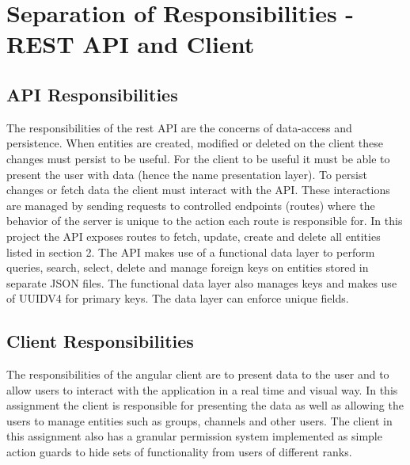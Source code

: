 \documentclass[11pt, conference,letterpaper]{IEEEtran}
\begin{document}
\section{Separation of Responsibilities - REST API and Client}
\subsection{API Responsibilities}
The responsibilities of the rest API are the concerns of data-access and persistence. When entities are created, modified or deleted on the client these changes must persist to be useful. For the client to be useful it must be able to present the user with data (hence the name presentation layer). To persist changes or fetch data the client must interact with the API. These interactions are managed by sending requests to controlled endpoints (routes) where the behavior of the server is unique to the action each route is responsible for. In this project the API exposes routes to fetch, update, create and delete all entities listed in section 2. The API makes use of a functional data layer to perform queries, search, select, delete and manage foreign keys on entities stored in separate JSON files. The functional data layer also manages keys and makes use of UUIDV4 for primary keys. The data layer can enforce unique fields.

\subsection{Client Responsibilities}
The responsibilities of the angular client are to present data to the user and to allow users to interact with the application in a real time and visual way. In this assignment the client is responsible for presenting the data as well as allowing the users to manage entities such as groups, channels and other users. The client in this assignment also has a granular permission system implemented as simple action guards to hide sets of functionality from users of different ranks.
\end{document}
